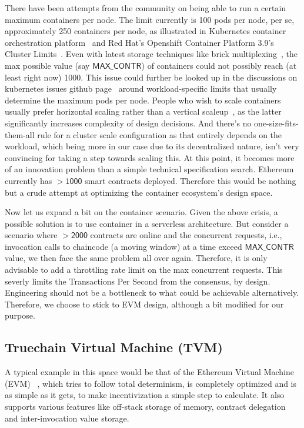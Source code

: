 \documentclass[9pt,oneside]{amsart}
\begin{document}
\begin{multicols}{2}
\smallskip
There have been attempts from the community on being able to run a certain maximum containers per node. The limit currently is 100 pods
per node, per se, approximately 250 containers per node, as illustrated in Kubernetes container orchestration platform~\cite{kubelimit}
and Red Hat's Openshift Container Platform 3.9's Cluster Limits~\cite{ocpclusterlimit}. Even with latest storage techniques like
brick multiplexing~\cite{brickmul}, the max possible value (say $\mathsf{MAX\_CONTR}$) of containers could not possibly reach
(at least right now) 1000. This issue could further be looked up in the discussions on kubernetes issues
github page~\cite{k8scale} around workload-specific limits that usually determine the maximum pods per node.
People who wish to scale containers usually prefer horizontal scaling rather than a vertical scaleup~\cite{cncfscaleout, kubecommgoals},
as the latter significantly increases complexity of design decisions. And there's no one-size-fits-them-all rule for a cluster scale
configuration as that entirely depends on the workload, which being more in our case due to its decentralized nature, isn't very
convincing for taking a step towards scaling this. At this point, it becomes more of an innovation problem than a simple technical
specification search. Ethereum currently has $\mathsf{ > 1000 }$ smart contracts deployed. Therefore this would be nothing but a crude
attempt at optimizing the container ecosystem's design space.

Now let us expand a bit on the container scenario. Given the above crisis, a possible solution is to use container in a
serverless architecture. But consider a scenario where $\mathsf{> 2000}$ contracts are online and the concurrent requests,
i.e., invocation calls to chaincode (a moving window) at a time exceed $\mathsf{MAX\_CONTR}$ value, we then face the same
problem all over again. Therefore, it is only advisable to add a throttling rate limit on the max concurrent requests.
This severly limits the Transactions Per Second from the consensus, by design. Engineering should not be a bottleneck to what could
be achievable alternatively. Therefore, we choose to stick to EVM design, although a bit modified for our purpose.

\subsection{Truechain Virtual Machine (TVM)}
\label{sec:tvm}

A typical example in this space would be that of the Ethereum Virtual Machine (EVM) ~\cite{gavinethereum}, which tries to follow
total determinism, is completely optimized and is as simple as it gets, to make incentivization a simple step to calculate.
It also supports various features like off-stack storage of memory, contract delegation and inter-invocation value storage.


\end{multicols}
\end{document}
